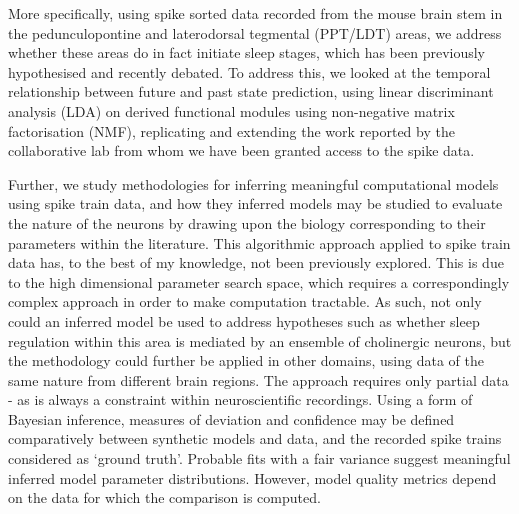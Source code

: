 \documentclass[mphil,deptreport,ianc]{infthesis} %
\begin{document}
More specifically, using spike sorted data recorded from the mouse brain stem in the pedunculopontine and laterodorsal tegmental (PPT/LDT) areas, we address whether these areas do in fact initiate sleep stages, which has been previously hypothesised and recently debated. 
To address this, we looked at the temporal relationship between future and past state prediction, using linear discriminant analysis (LDA) on derived functional modules using non-negative matrix factorisation (NMF), replicating and extending the work reported by the collaborative lab from whom we have been granted access to the spike data.

Further, we study methodologies for inferring meaningful computational models using spike train data, and how they inferred models may be studied to evaluate the nature of the neurons by drawing upon the biology corresponding to their parameters within the literature.
This algorithmic approach applied to spike train data has, to the best of my knowledge, not been previously explored. This is due to the high dimensional parameter search space, which requires a correspondingly complex approach in order to make computation tractable.
As such, not only could an inferred model be used to address hypotheses such as whether sleep regulation within this area is mediated by an ensemble of cholinergic neurons, but the methodology could further be applied in other domains, using data of the same nature from different brain regions.
The approach requires only partial data - as is always a constraint within neuroscientific recordings. Using a form of Bayesian inference, measures of deviation and confidence may be defined comparatively between synthetic models and data, and the recorded spike trains considered as ‘ground truth’. Probable fits with a fair variance suggest meaningful inferred model parameter distributions. However, model quality metrics depend on the data for which the comparison is computed.
\end{document}
